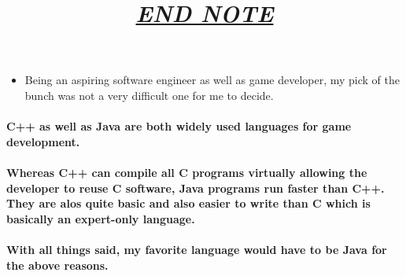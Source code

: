 \documentclass{article}
\begin{document}
	\title{\underline{\textbf{\textit{END NOTE}}}}
	\maketitle
	\begin{itemize}
	\item Being an aspiring software engineer as well as game developer, my pick of the bunch was not a very difficult one for me to decide.
\end{itemize} 
	\paragraph{C++ as well as Java are both widely used languages for game development. }
	\paragraph{Whereas C++ can compile all C programs virtually allowing the developer to reuse C software, Java programs run faster than C++. They are alos quite basic and also easier to write than C which is basically an expert-only language.}
	\paragraph{With all things said, my favorite language would have to be Java for the above reasons.}
	
\end{document}
